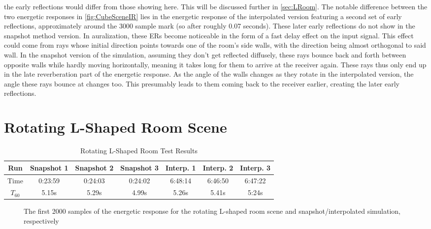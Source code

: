 the early reflections would differ from those showing here.
This will be discussed further in \autoref{sec:LRoom}.
\newline
The notable difference between the two energetic responses in \autoref{fig:CubeSceneIR}
lies in the energetic response of the interpolated version featuring a second set of early reflections,
approximately around the 3000 sample mark (so after roughly 0.07 seconds).
These later early reflections do not show in the snapshot method version.
In auralization, these ERs become noticeable in the form of a fast delay effect on the input signal.
\newline
This effect could come from rays whose initial direction points towards one of the room's side walls,
with the direction being almost orthogonal to said wall.
In the snapshot version of the simulation, assuming they don't get reflected diffusely,
these rays bounce back and forth between opposite walls while hardly moving horizontally,
meaning it takes long for them to arrive at the receiver again.
These rays thus only end up in the late reverberation part of the energetic response.
\newline
As the angle of the walls changes as they rotate in the interpolated version,
the angle these rays bounce at changes too.
This presumably leads to them coming back to the receiver earlier, creating the later early reflections.

\section{Rotating L-Shaped Room Scene}\label{sec:LRoom}

\begin{table}[t!]
    \centering
    \begin{tabular}{| c | c | c | c | c | c | c |}
        \hline
        Run        & Snapshot 1 & Snapshot 2 & Snapshot 3 & Interp. 1 & Interp. 2 & Interp. 3 \\
        \hline
        Time       & 0:23:59    & 0:24:03    & 0:24:02    & 6:48:14   & 6:46:50   & 6:47:22   \\
        \hline
        \(T_{60}\) & 5.15s      & 5.29s      & 4.99s      & 5.26s     & 5.41s     & 5:24s     \\
        \hline
    \end{tabular}
    \caption{Rotating L-Shaped Room Test Results}\label{tbl:LSceneTable}
\end{table}

\begin{figure}[t!]
    \begin{center}
        
    \end{center}
    \caption{The first 2000 samples of the energetic response for the rotating L-shaped room scene and snapshot/interpolated simulation, respectively}\label{fig:LSceneIR}
\end{figure}

